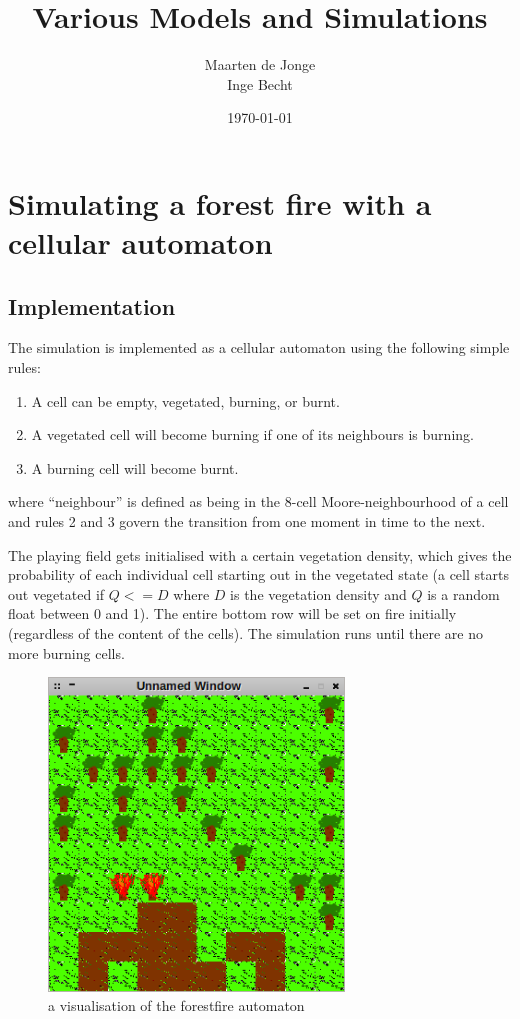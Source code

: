 \documentclass[a4paper]{report}
\author{Maarten de Jonge \\
        Inge Becht}
\date{\today}
\title{Various Models and Simulations}
\begin{document}
\maketitle

\chapter{Simulating a forest fire with a cellular automaton}
\label{cha:ff}

\section{Implementation} 
\label{sec:ff_impl}

The simulation is implemented as a cellular automaton using the following simple
rules:
\begin{enumerate}
    \item A cell can be empty, vegetated, burning, or burnt.
    \item A vegetated cell will become burning if one of its neighbours is
          burning.
    \item A burning cell will become burnt.
\end{enumerate}
where ``neighbour'' is defined as being in the 8-cell Moore-neighbourhood of a
cell and rules 2 and 3 govern the transition from one moment in time to the
next.

The playing field gets initialised with a certain vegetation density, which
gives the probability of each individual cell starting out in the vegetated
state (a cell starts out vegetated if $Q <= D$ where $D$ is the vegetation
density and $Q$ is a random float between 0 and 1). The entire bottom row will
be set on fire initially (regardless of the content of the cells). The
simulation runs until there are no more burning cells.

\begin{figure}[htbp]
    \centering
    \includegraphics[width=0.7\textwidth]{./sdl.png}
    \caption{a visualisation of the forestfire automaton}
    \label{fig:sdl}
\end{figure}
\end{document}
